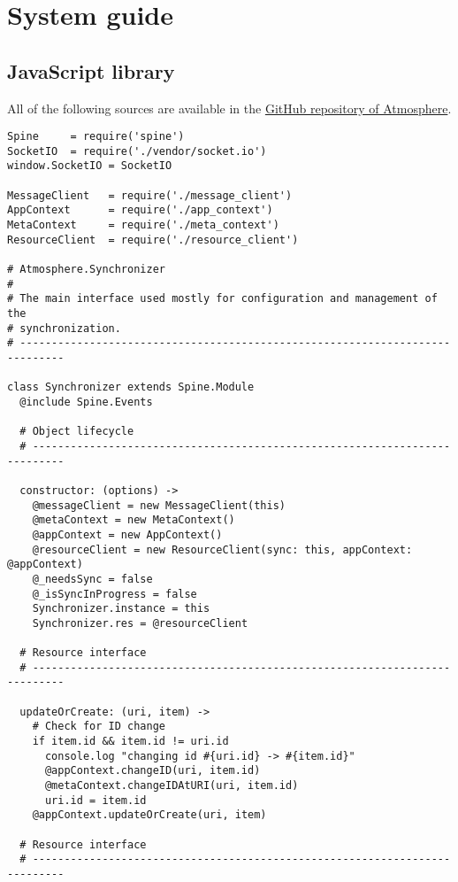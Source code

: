 \renewcommand{\thesection} {\Alph{section}}
\setcounter{section}{1}
\section{System guide}

\subsection{JavaScript library}

All of the following sources are available in the \href{https://github.com/vojto/atmos2}{GitHub repository of Atmosphere}.

\begin{lstlisting}[caption=synchronizer.coffee]
Spine     = require('spine')
SocketIO  = require('./vendor/socket.io')
window.SocketIO = SocketIO

MessageClient   = require('./message_client')
AppContext      = require('./app_context')
MetaContext     = require('./meta_context')
ResourceClient  = require('./resource_client')

# Atmosphere.Synchronizer
#
# The main interface used mostly for configuration and management of the
# synchronization.
# -----------------------------------------------------------------------------

class Synchronizer extends Spine.Module
  @include Spine.Events

  # Object lifecycle
  # ---------------------------------------------------------------------------
  
  constructor: (options) ->
    @messageClient = new MessageClient(this)
    @metaContext = new MetaContext()
    @appContext = new AppContext()
    @resourceClient = new ResourceClient(sync: this, appContext: @appContext)
    @_needsSync = false
    @_isSyncInProgress = false
    Synchronizer.instance = this
    Synchronizer.res = @resourceClient

  # Resource interface
  # ---------------------------------------------------------------------------

  updateOrCreate: (uri, item) ->
    # Check for ID change
    if item.id && item.id != uri.id
      console.log "changing id #{uri.id} -> #{item.id}"
      @appContext.changeID(uri, item.id)
      @metaContext.changeIDAtURI(uri, item.id)
      uri.id = item.id
    @appContext.updateOrCreate(uri, item)

  # Resource interface
  # ---------------------------------------------------------------------------


\end{lstlisting}
